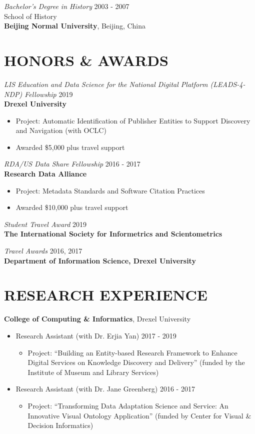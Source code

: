 \documentclass[margin, 10pt]{res} %
\begin{document}
\begin{resume}
{\sl Bachelor’s Degree in History} \hfill 2003 - 2007\\
School of History\\
\textbf{Beijing Normal University}, Beijing, China


\section{HONORS \& AWARDS}

{\sl LIS Education and Data Science for the National Digital Platform (LEADS-4-NDP) Fellowship}  \hfill 2019 \\
\textbf{Drexel University}
\begin{itemize}
\item Project: Automatic Identification of Publisher Entities to Support Discovery and Navigation (with OCLC)
\item Awarded \$5,000 plus travel support
\end{itemize} 

{\sl RDA/US Data Share Fellowship}  \hfill 2016 - 2017 \\
\textbf{Research Data Alliance}
\begin{itemize}
\item Project: Metadata Standards and Software Citation Practices
\item Awarded \$10,000 plus travel support
\end{itemize} 

{\sl Student Travel Award} \hfill 2019 \\
\textbf{The International Society for Informetrics and Scientometrics}

{\sl Travel Awards} \hfill 2016, 2017 \\
\textbf{Department of Information Science, Drexel University}

\section{RESEARCH EXPERIENCE}

\textbf{College of Computing \& Informatics}, Drexel University\\
\begin{itemize}
     \item Research Assistant (with Dr. Erjia Yan) \hfill 2017 - 2019
     \begin{itemize}
     	\item  Project: “Building an Entity-based Research Framework to Enhance Digital Services on Knowledge Discovery and Delivery” (funded by the Institute of Museum and Library Services)
   	\end{itemize}
   	\item Research Assistant (with Dr. Jane Greenberg) \hfill 2016 - 2017
     \begin{itemize}
     	\item  Project: “Transforming Data Adaptation Science and Service: An Innovative Visual Ontology Application” (funded by Center for Visual \& Decision Informatics)
   	\end{itemize}
\end{itemize}


\end{resume}
\end{document}
